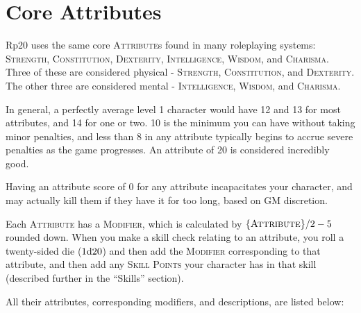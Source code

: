 \section{Core Attributes}
Rp20 uses the same core \textsc{Attribute}s found in many roleplaying systems: \textsc{Strength}, \textsc{Constitution}, \textsc{Dexterity}, \textsc{Intelligence}, \textsc{Wisdom}, and \textsc{Charisma}. Three of these are considered physical - \textsc{Strength}, \textsc{Constitution}, and \textsc{Dexterity}. The other three are considered mental - \textsc{Intelligence}, \textsc{Wisdom}, and \textsc{Charisma}.

In general, a perfectly average level 1 character would have 12 and 13 for most attributes, and 14 for one or two. 10 is the minimum you can have without taking minor penalties, and less than 8 in any attribute typically begins to accrue severe penalties as the game progresses. An attribute of 20 is considered incredibly good.

Having an attribute score of 0 for any attribute incapacitates your character, and may actually kill them if they have it for too long, based on GM discretion.

Each \textsc{Attribute} has a \textsc{Modifier}, which is calculated by $\{ \textsc{Attribute} \}/2 - 5$ rounded down. When you make a skill check relating to an attribute, you roll a twenty-sided die ($1\mathrm{d}20$) and then add the \textsc{Modifier} corresponding to that attribute, and then add any \textsc{Skill Points} your character has in that skill (described further in the ``Skills'' section).

All their attributes, corresponding modifiers, and descriptions, are listed below:

